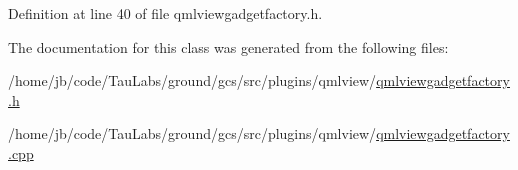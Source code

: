 \-Definition at line 40 of file qmlviewgadgetfactory.\-h.



\-The documentation for this class was generated from the following files\-:\begin{DoxyCompactItemize}
\item 
/home/jb/code/\-Tau\-Labs/ground/gcs/src/plugins/qmlview/\hyperlink{qmlviewgadgetfactory_8h}{qmlviewgadgetfactory.\-h}\item 
/home/jb/code/\-Tau\-Labs/ground/gcs/src/plugins/qmlview/\hyperlink{qmlviewgadgetfactory_8cpp}{qmlviewgadgetfactory.\-cpp}\end{DoxyCompactItemize}

